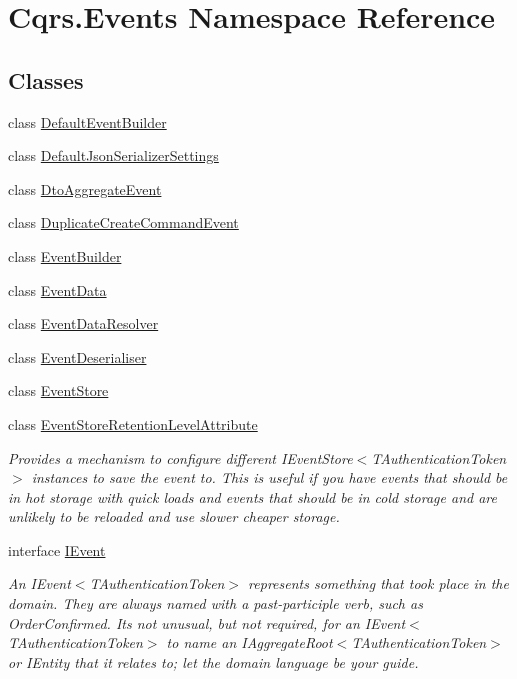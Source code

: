 \hypertarget{namespaceCqrs_1_1Events}{}\section{Cqrs.\+Events Namespace Reference}
\label{namespaceCqrs_1_1Events}
\subsection*{Classes}
\begin{DoxyCompactItemize}
\item 
class \hyperlink{classCqrs_1_1Events_1_1DefaultEventBuilder}{Default\+Event\+Builder}
\item 
class \hyperlink{classCqrs_1_1Events_1_1DefaultJsonSerializerSettings}{Default\+Json\+Serializer\+Settings}
\item 
class \hyperlink{classCqrs_1_1Events_1_1DtoAggregateEvent}{Dto\+Aggregate\+Event}
\item 
class \hyperlink{classCqrs_1_1Events_1_1DuplicateCreateCommandEvent}{Duplicate\+Create\+Command\+Event}
\item 
class \hyperlink{classCqrs_1_1Events_1_1EventBuilder}{Event\+Builder}
\item 
class \hyperlink{classCqrs_1_1Events_1_1EventData}{Event\+Data}
\item 
class \hyperlink{classCqrs_1_1Events_1_1EventDataResolver}{Event\+Data\+Resolver}
\item 
class \hyperlink{classCqrs_1_1Events_1_1EventDeserialiser}{Event\+Deserialiser}
\item 
class \hyperlink{classCqrs_1_1Events_1_1EventStore}{Event\+Store}
\item 
class \hyperlink{classCqrs_1_1Events_1_1EventStoreRetentionLevelAttribute}{Event\+Store\+Retention\+Level\+Attribute}
\begin{DoxyCompactList}\small\item\em Provides a mechanism to configure different I\+Event\+Store$<$\+T\+Authentication\+Token$>$ instances to save the event to. This is useful if you have events that should be in hot storage with quick loads and events that should be in cold storage and are unlikely to be reloaded and use slower cheaper storage. \end{DoxyCompactList}\item 
interface \hyperlink{interfaceCqrs_1_1Events_1_1IEvent}{I\+Event}
\begin{DoxyCompactList}\small\item\em An I\+Event$<$\+T\+Authentication\+Token$>$ represents something that took place in the domain. They are always named with a past-\/participle verb, such as Order\+Confirmed. It\textquotesingle{}s not unusual, but not required, for an I\+Event$<$\+T\+Authentication\+Token$>$ to name an I\+Aggregate\+Root$<$\+T\+Authentication\+Token$>$ or I\+Entity that it relates to; let the domain language be your guide. \end{DoxyCompactList}\item 

\end{DoxyCompactItemize}
